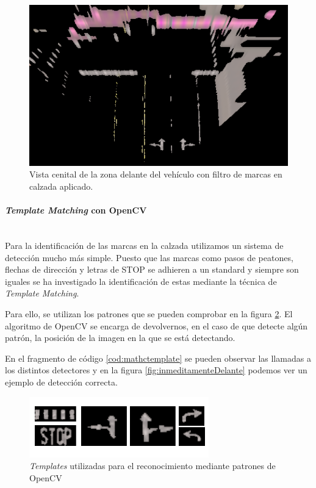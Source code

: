 \begin{figure}[h!]
    \centering
    \includegraphics[width=.8\linewidth]{img/frontMasked.png}
    \caption{Vista cenital de la zona delante del vehículo con filtro de marcas en calzada aplicado.}
    \label{fig:frontMasked}
\end{figure}




\clearpage
\paragraph{\textit{Template Matching} con OpenCV}\mbox{}\\
Para la identificación de las marcas en la calzada utilizamos un sistema de detección mucho más simple.
Puesto que las marcas como pasos de peatones, flechas de dirección y letras de STOP se adhieren a un standard y siempre son iguales se ha investigado la identificación de estas mediante la técnica de \textit{Template Matching}.

Para ello, se utilizan los patrones que se pueden comprobar en la figura \ref{fig:templatespatter}. El algoritmo de OpenCV se encarga de devolvernos, en el caso de que detecte algún patrón, la posición de la imagen en la que se está detectando.

En el fragmento de código \ref{cod:mathctemplate} se pueden observar las llamadas a los distintos detectores y en la figura \ref{fig:inmeditamenteDelante} podemos ver un ejemplo de detección correcta.

\begin{figure}[h!]
    \centering
    \includegraphics[width=.8\linewidth]{img/TemplatesPatternMatching.png}
    \caption{\textit{Templates} utilizadas para el reconocimiento mediante patrones de OpenCV}
    \label{fig:templatespatter}
\end{figure}

